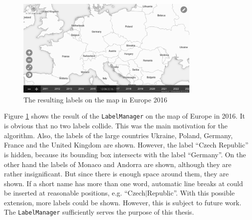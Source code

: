 \begin{figure}[ht]
  \vspace{1em}
  \centering
  \includegraphics[width=0.8\textwidth]{graphics/development/implementation/label_manager.png}
  \caption{The resulting labels on the map in Europe 2016}
  \label{fig:label_manager}
\end{figure}

Figure \ref{fig:label_manager} shows the result of the \texttt{LabelManager} on the map of Europe in 2016. It is obvious that no two labels collide. This was the main motivation for the algorithm. Also, the labels of the large countries Ukraine, Poland, Germany, France and the United Kingdom are shown. However, the label ``Czech Republic'' is hidden, because its bounding box intersects with the label ``Germany''. On the other hand the labels of Monaco and Andorra are shown, although they are rather insignificant. But since there is enough space around them, they are shown.
If a short name has more than one word, automatic line breaks at could be inserted at reasonable positions, e.g. ``Czech$|$Republic''. With this possible extension, more labels could be shown.
However, this is subject to future work.
The \texttt{LabelManager} sufficiently serves the purpose of this thesis.



